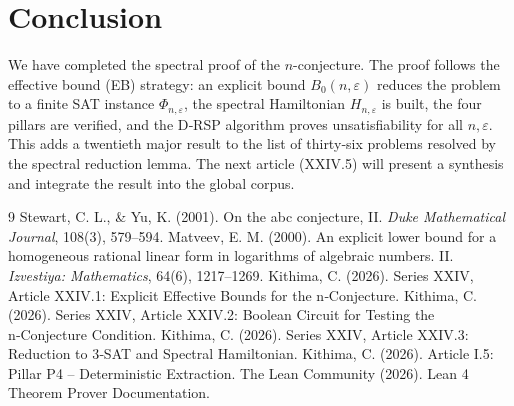 \documentclass[11pt,a4paper]{article}
\begin{document}
\section{Conclusion}
We have completed the spectral proof of the $n$-conjecture. The proof follows the effective bound (EB) strategy: an explicit bound $B_0(n,\varepsilon)$ reduces the problem to a finite SAT instance $\Phi_{n,\varepsilon}$, the spectral Hamiltonian $H_{n,\varepsilon}$ is built, the four pillars are verified, and the D‑RSP algorithm proves unsatisfiability for all $n,\varepsilon$. This adds a twentieth major result to the list of thirty‑six problems resolved by the spectral reduction lemma. The next article (XXIV.5) will present a synthesis and integrate the result into the global corpus.


\begin{thebibliography}{9}
  Stewart, C. L., \& Yu, K. (2001). On the abc conjecture, II. \emph{Duke Mathematical Journal}, 108(3), 579–594.
  Matveev, E. M. (2000). An explicit lower bound for a homogeneous rational linear form in logarithms of algebraic numbers. II. \emph{Izvestiya: Mathematics}, 64(6), 1217–1269.
  Kithima, C. (2026). Series XXIV, Article XXIV.1: Explicit Effective Bounds for the n‑Conjecture.
  Kithima, C. (2026). Series XXIV, Article XXIV.2: Boolean Circuit for Testing the n‑Conjecture Condition.
  Kithima, C. (2026). Series XXIV, Article XXIV.3: Reduction to 3‑SAT and Spectral Hamiltonian.
  Kithima, C. (2026). Article I.5: Pillar P4 – Deterministic Extraction.
  The Lean Community (2026). Lean 4 Theorem Prover Documentation.
\end{thebibliography}
\end{document}
